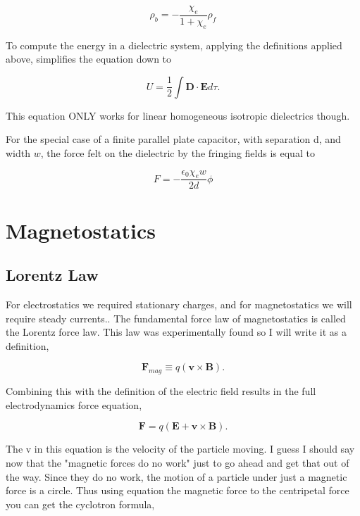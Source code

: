 \documentclass[preprint, review,12pt]{elsarticle}
\def\x{\times}
\def\.{\cdot}
\def\b{\textbf}
\begin{document}
\begin{equation}
    \rho_b = - \frac{\chi_e}{1+\chi_e}\rho_f
\end{equation}

To compute the energy in a dielectric system, applying the definitions applied above, simplifies the equation down to

\begin{equation}
    U = \frac{1}{2}\int \b{D}\. \b{E}d\tau.
\end{equation}

This equation ONLY works for linear homogeneous isotropic dielectrics though.

For the special case of a finite parallel plate capacitor, with separation d, and width $w$, the force felt on the dielectric by the fringing fields is equal to 

\begin{equation}
    F = -\frac{\epsilon_0\chi_ew}{2d}\phi
\end{equation}

\section{Magnetostatics}

\subsection{Lorentz Law}

For electrostatics we required stationary charges, and for magnetostatics we will require steady currents.. The fundamental force law of magnetostatics is called the Lorentz force law. This law was experimentally found so I will write it as a definition,

\begin{equation}
    \b{F}_{mag} \equiv q(\b{v} \x \b{B}).
\end{equation}

Combining this with the definition of the electric field results in the full electrodynamics force equation,

\begin{equation}
    \b{F} = q(\b{E} + \b{v} \x \b{B}).
\end{equation}

The v in this equation is the velocity of the particle moving. I guess I should say now that the "magnetic forces do no work" just to go ahead and get that out of the way. Since they do no work, the motion of a particle under just a magnetic force is a circle. Thus using equation the magnetic force to the centripetal force you can get the cyclotron formula,
\end{document}
